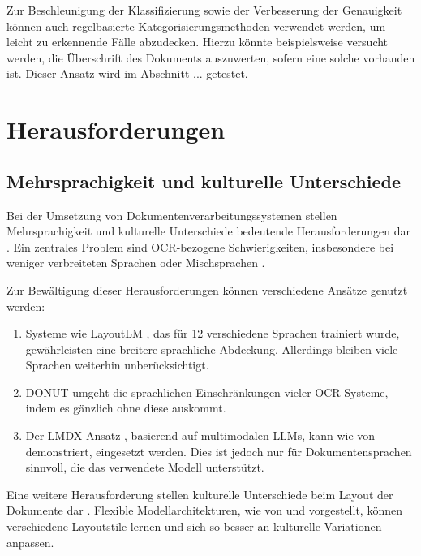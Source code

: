 Zur Beschleunigung der Klassifizierung sowie der Verbesserung der Genauigkeit können auch regelbasierte Kategorisierungsmethoden verwendet werden, um leicht zu erkennende Fälle abzudecken. Hierzu könnte beispielsweise versucht werden, die Überschrift des Dokuments auszuwerten, sofern eine solche vorhanden ist. Dieser Ansatz wird im Abschnitt ... getestet.

\section{Herausforderungen}
\label{sec:herausforderungen-und-offene-probleme}

\subsection{Mehrsprachigkeit und kulturelle Unterschiede}
\label{subsec:mehrsprachigkeit-und-kulturelle-unterschiede}

Bei der Umsetzung von Dokumentenverarbeitungssystemen stellen Mehrsprachigkeit und kulturelle Unterschiede bedeutende Herausforderungen dar \parencite{XuYiheng2020LPoT, SubramaniNishant2021ASoD}. Ein zentrales Problem sind \gls{OCR}-bezogene Schwierigkeiten, insbesondere bei weniger verbreiteten Sprachen oder Mischsprachen \parencite{OlejniczakKrzysztof2023TDFA}.

Zur Bewältigung dieser Herausforderungen können verschiedene Ansätze genutzt werden:

\begin{enumerate}
	\item Systeme wie LayoutLM \parencite{XuYiheng2020LPoT}, das für 12 verschiedene Sprachen trainiert wurde, gewährleisten eine breitere sprachliche Abdeckung. Allerdings bleiben viele Sprachen weiterhin unberücksichtigt.
	
	\item \gls{DONUT} \parencite{KimGeewook2022ODUT} umgeht die sprachlichen Einschränkungen vieler \gls{OCR}-Systeme, indem es gänzlich ohne diese auskommt.
	
	\item Der \gls{LMDX}-Ansatz \parencite{PerotVincent2024LLMD}, basierend auf multimodalen \glspl{LLM}, kann wie von \textcite{BiswasAnjanava2024RoSD} demonstriert, eingesetzt werden. Dies ist jedoch nur für Dokumentensprachen sinnvoll, die das verwendete Modell unterstützt.
\end{enumerate}

Eine weitere Herausforderung stellen kulturelle Unterschiede beim Layout der Dokumente dar \parencite{KimGeewook2022ODUT}. Flexible Modellarchitekturen, wie von \textcite{KimGeewook2022ODUT} und \textcite{PerotVincent2024LLMD} vorgestellt, können verschiedene Layoutstile lernen und sich so besser an kulturelle Variationen anpassen.

